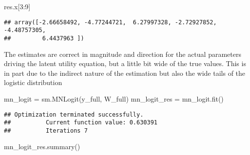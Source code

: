 \documentclass[]{tufte-book}
\newenvironment{Shaded}{}{}
\newcommand{\DecValTok}[1]{\textcolor[rgb]{0.25,0.63,0.44}{#1}}
\newcommand{\NormalTok}[1]{#1}
\newcommand{\OperatorTok}[1]{\textcolor[rgb]{0.40,0.40,0.40}{#1}}
\theoremstyle{definition}
\theoremstyle{definition}
\theoremstyle{definition}
\theoremstyle{remark}
\begin{document}
\begin{Shaded}
\begin{Highlighting}[]
\NormalTok{res.x[}\DecValTok{3}\NormalTok{:}\DecValTok{9}\NormalTok{]}
\end{Highlighting}
\end{Shaded}

\begin{verbatim}
## array([-2.66658492, -4.77244721,  6.27997328, -2.72927852, -4.48757305,
##         6.4437963 ])
\end{verbatim}

The estimates are correct in magnitude and direction for the actual parameters driving the latent utility equation, but a little bit wide of the true values. This is in part due to the indirect nature of the estimation but also the wide tails of the logistic distribution

\begin{Shaded}
\begin{Highlighting}[]
\NormalTok{mn\_logit }\OperatorTok{=}\NormalTok{ sm.MNLogit(y\_full, W\_full)}
\NormalTok{mn\_logit\_res }\OperatorTok{=}\NormalTok{ mn\_logit.fit()}
\end{Highlighting}
\end{Shaded}

\begin{verbatim}
## Optimization terminated successfully.
##          Current function value: 0.630391
##          Iterations 7
\end{verbatim}

\begin{Shaded}
\begin{Highlighting}[]
\NormalTok{mn\_logit\_res.summary()}
\end{Highlighting}
\end{Shaded}
\end{document}
